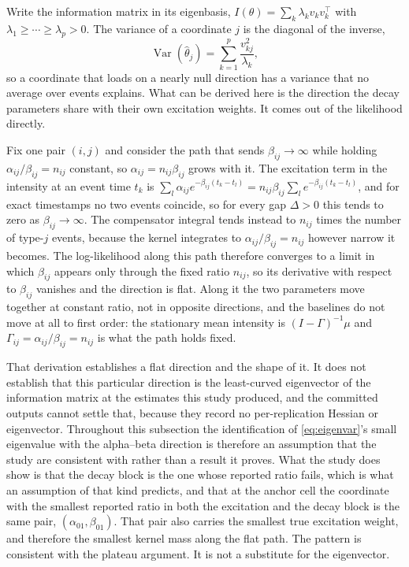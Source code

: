 Write the information matrix in its eigenbasis, $I(\theta) = \sum_k \lambda_k
v_k v_k^{\top}$ with $\lambda_1 \ge \cdots \ge \lambda_p > 0$. The variance of a
coordinate $j$ is the diagonal of the inverse,
\begin{equation}
\operatorname{Var}(\hat\theta_j) = \sum_{k=1}^{p} \frac{v_{kj}^2}{\lambda_k},
\label{eq:eigenvar}
\end{equation}
so a coordinate that loads on a nearly null direction has a variance that no
average over events explains. What can be derived here is the direction the decay
parameters share with their own excitation weights. It comes out of the likelihood
directly.

Fix one pair $(i,j)$ and consider the path that sends $\beta_{ij} \to \infty$ while
holding $\alpha_{ij}/\beta_{ij} = n_{ij}$ constant, so $\alpha_{ij} = n_{ij}
\beta_{ij}$ grows with it. The excitation term in the intensity at an event time
$t_k$ is $\sum_{l} \alpha_{ij} e^{-\beta_{ij}(t_k - t_l)} = n_{ij} \beta_{ij}
\sum_l e^{-\beta_{ij}(t_k - t_l)}$, and for exact timestamps no two events coincide,
so for every gap $\Delta > 0$ this tends to zero as $\beta_{ij} \to \infty$. The
compensator integral tends instead to $n_{ij}$ times the number of type-$j$ events,
because the kernel integrates to $\alpha_{ij}/\beta_{ij} = n_{ij}$ however narrow it
becomes. The log-likelihood along this path therefore converges to a limit in which
$\beta_{ij}$ appears only through the fixed ratio $n_{ij}$, so its derivative with
respect to $\beta_{ij}$ vanishes and the direction is flat. Along it the two
parameters move together at constant ratio, not in opposite directions, and the
baselines do not move at all to first order: the stationary mean intensity is
$(I - \Gamma)^{-1}\mu$ and $\Gamma_{ij} = \alpha_{ij}/\beta_{ij} = n_{ij}$ is what
the path holds fixed.

That derivation establishes a flat direction and the shape of it. It does not
establish that this particular direction is the least-curved eigenvector of the
information matrix at the estimates this study produced, and the committed outputs
cannot settle that, because they record no per-replication Hessian or eigenvector.
Throughout this subsection the identification of \eqref{eq:eigenvar}'s small
eigenvalue with the alpha--beta direction is therefore an assumption that the study
are consistent with rather than a result it proves. What the study does show is that
the decay block is the one whose reported ratio fails, which is what an assumption
of that kind predicts, and that at the anchor cell the coordinate with the smallest
reported ratio in both the excitation and the decay block is the same pair,
$(\alpha_{01}, \beta_{01})$. That pair also carries the smallest true
excitation weight, and therefore the smallest kernel mass along the flat path. The
pattern is consistent with the plateau argument. It is not a substitute for the
eigenvector.

